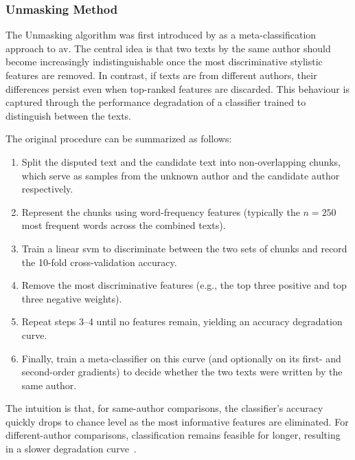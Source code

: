 

\subsubsection{Unmasking Method}
\label{subsec:unmasking}

The Unmasking algorithm was first introduced by \citet{koppel_authorship_2004} as a meta-classification approach to \ac{av}. 
The central idea is that two texts by the same author should become increasingly indistinguishable once the most discriminative stylistic features are removed. 
In contrast, if texts are from different authors, their differences persist even when top-ranked features are discarded. 
This behaviour is captured through the performance degradation of a classifier trained to distinguish between the texts.

The original procedure can be summarized as follows:
\begin{enumerate}
    \item Split the disputed text and the candidate text into non-overlapping chunks, which serve as samples from the unknown author and the candidate author respectively. 
    \item Represent the chunks using word-frequency features (typically the $n=250$ most frequent words across the combined texts).
    \item Train a linear \ac{svm} to discriminate between the two sets of chunks and record the 10-fold cross-validation accuracy.
    \item Remove the most discriminative features (e.g., the top three positive and top three negative weights).  
    \item Repeat steps 3–4 until no features remain, yielding an accuracy degradation curve.  
    \item Finally, train a meta-classifier on this curve (and optionally on its first- and second-order gradients) to decide whether the two texts were written by the same author.  
\end{enumerate}
The intuition is that, for same-author comparisons, the classifier’s accuracy quickly drops to chance level as the most informative features are eliminated. 
For different-author comparisons, classification remains feasible for longer, resulting in a slower degradation curve~\citep{stein_intrinsic_2011,tyo_state_2022,bevendorff_divergence_based_2020,stamatatos_survey_2009}. 

